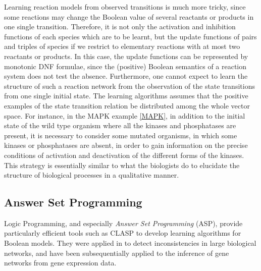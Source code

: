 \documentclass[graybox]{svmult}
\begin{document}
\begin{example}
  Learning reaction models from observed transitions is much more tricky,
  since some reactions may change the Boolean value of several reactants or products in one single transition.
  Therefore, it is not only the activation and inhibition functions of each species which are to be learnt,
  but the update functions of pairs and triples of species if we restrict to elementary reactions with at most two reactants or products.
  In this case, the update functions can be represented by monotonic DNF formulae, since the (positive) Boolean semantics of a reaction system does not test the absence. 
Furthermore,   one cannot expect to learn the structure of such a reaction network
from the observation of the state transitions from one single initial state.
The learning algorithms assumes that the positive examples of the state transition relation be distributed
among the whole vector space.
For instance, in the MAPK example \ref{MAPK}, in addition to the initial state of the wild type organism where all the kinases and phosphatases are present,
it is necessary to consider some mutated organisms, in which some kinases or phosphatases are absent,
in order to gain information on the precise conditions of activation and deactivation of the different forms of the kinases.
This strategy is essentially similar to what the biologists do to elucidate the structure of biological processes
in a qualitative manner.
\end{example}

\subsection{Answer Set Programming}\label{asp}

Logic Programming, and especially \emph{Answer Set Programming} (ASP), provide particularly efficient tools such as CLASP \cite{GKNS07lpnmr} to develop learning algorithms for Boolean models.
They were applied in \cite{GSTUV08iclp} to detect inconsistencies in large biological networks,
and have been subsequentially applied to the inference of gene networks from gene expression data.
\end{document}
